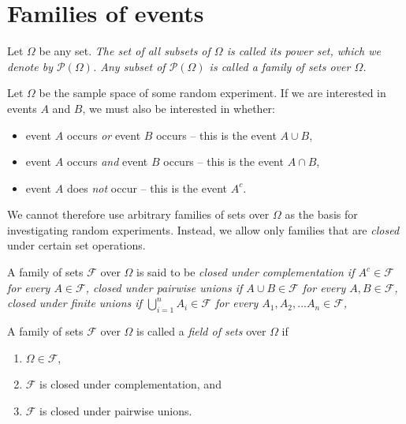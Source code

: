 \section{Families of events}
\begin{definition}
Let $\Omega$ be any set. 
\ben
\it The set of all subsets of $\Omega$ is called its \emph{power set}, which we denote by $\mathcal{P}(\Omega)$.
\it Any subset of $\mathcal{P}(\Omega)$ is called a \emph{family of sets over $\Omega$}.
\een
\end{definition}

Let $\Omega$ be the sample space of some random experiment. 
If we are interested in events $A$ and $B$, we must also be interested in whether:

\begin{itemize}
\item event $A$ occurs \emph{or} event $B$ occurs -- this is the event $A\cup B$,
\item event $A$ occurs \emph{and} event $B$ occurs -- this is the event $A\cap B$,
\item event $A$ does \emph{not} occur -- this is the event $A^c$.
\end{itemize}

\smallskip
We cannot therefore use arbitrary families of sets over $\Omega$ as the basis for investigating random experiments. Instead, we allow only families that are \emph{closed} under certain set operations.

\break

\begin{definition}
A family of sets $\mathcal{F}$ over $\Omega$ is said to be
\ben
\it \emph{closed under complementation} if $A^c\in\mathcal{F}$ for every $A\in\mathcal{F}$, 
\it \emph{closed under pairwise unions} if $A\cup B\in\mathcal{F}$ for every $A,B\in\mathcal{F}$, 
\it \emph{closed under finite unions}	if $\bigcup_{i=1}^{n} A_i\in\mathcal{F}$ for every $A_1,A_2,\ldots A_n\in\mathcal{F}$,
\een
\end{definition}

\begin{definition}
A family of sets $\mathcal{F}$ over $\Omega$ is called a \emph{field of sets} over $\Omega$ if
\begin{enumerate}
\item $\Omega\in\mathcal{F}$,
\item $\mathcal{F}$ is closed under complementation, and
\item $\mathcal{F}$ is closed under pairwise unions.
\end{enumerate}
\end{definition}

